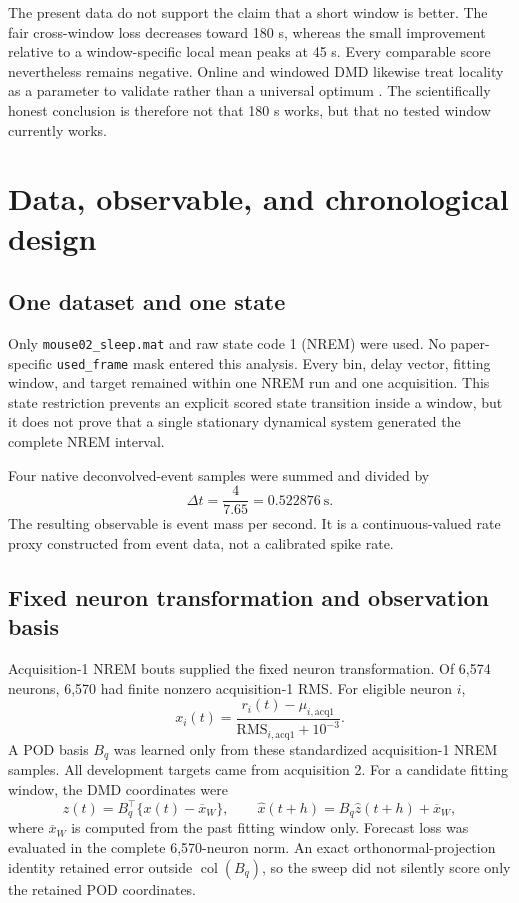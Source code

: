 \documentclass[11pt]{article}
\begin{document}
The present data do not support the claim that a short window is better.  The
fair cross-window loss decreases toward 180 s, whereas the small improvement
relative to a window-specific local mean peaks at 45 s.  Every comparable
score nevertheless remains negative.  Online and windowed DMD likewise treat
locality as a parameter to validate rather than a universal optimum
\cite{windoweddmd,lapo}.  The scientifically honest conclusion is therefore
not that 180 s works, but that no tested window currently works.

\section{Data, observable, and chronological design}

\subsection{One dataset and one state}

Only \texttt{mouse02\_sleep.mat} and raw state code 1 (NREM) were used.  No
paper-specific \texttt{used\_frame} mask entered this analysis.  Every bin,
delay vector, fitting window, and target remained within one NREM run and one
acquisition.  This state restriction prevents an explicit scored state
transition inside a window, but it does not prove that a single stationary
dynamical system generated the complete NREM interval.

Four native deconvolved-event samples were summed and divided by
\[
\Delta t=\frac{4}{7.65}=0.522876\ \mathrm{s}.
\]
The resulting observable is event mass per second.  It is a continuous-valued
rate proxy constructed from event data, not a calibrated spike rate.

\subsection{Fixed neuron transformation and observation basis}

Acquisition-1 NREM bouts supplied the fixed neuron transformation.  Of 6,574
neurons, 6,570 had finite nonzero acquisition-1 RMS.  For eligible neuron
\(i\),
\[
x_i(t)=
\frac{r_i(t)-\mu_{i,\mathrm{acq1}}}
{\mathrm{RMS}_{i,\mathrm{acq1}}+10^{-3}}.
\]
A POD basis \(B_q\) was learned only from these standardized acquisition-1
NREM samples.  All development targets came from acquisition 2.  For a
candidate fitting window, the DMD coordinates were
\[
z(t)=B_q^\top\{x(t)-\overline x_W\},
\qquad
\widehat x(t+h)=B_q\widehat z(t+h)+\overline x_W,
\]
where \(\overline x_W\) is computed from the past fitting window only.
Forecast loss was evaluated in the complete 6,570-neuron norm.  An exact
orthonormal-projection identity retained error outside
\(\operatorname{col}(B_q)\), so the sweep did not silently score only the
retained POD coordinates.
\end{document}
